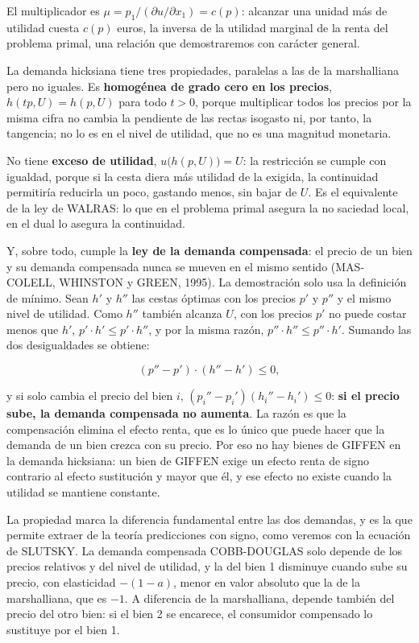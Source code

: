 \documentclass[10pt,a4paper]{article}
\begin{document}
El multiplicador es $\mu=p_1/(\partial u/\partial x_1)=c(p)$: alcanzar una unidad más de utilidad cuesta $c(p)$ euros, la inversa de la utilidad marginal de la renta del problema primal, una relación que demostraremos con carácter general.

La demanda hicksiana tiene tres propiedades, paralelas a las de la marshalliana pero no iguales. Es \textbf{homogénea de grado cero en los precios}, $h(tp,U)=h(p,U)$ para todo $t>0$, porque multiplicar todos los precios por la misma cifra no cambia la pendiente de las rectas isogasto ni, por tanto, la tangencia; no lo es en el nivel de utilidad, que no es una magnitud monetaria.

No tiene \textbf{exceso de utilidad}, $u\big(h(p,U)\big)=U$: la restricción se cumple con igualdad, porque si la cesta diera más utilidad de la exigida, la continuidad permitiría reducirla un poco, gastando menos, sin bajar de $U$. Es el equivalente de la ley de WALRAS: lo que en el problema primal asegura la no saciedad local, en el dual lo asegura la continuidad.

Y, sobre todo, cumple la \textbf{ley de la demanda compensada}: el precio de un bien y su demanda compensada nunca se mueven en el mismo sentido (MAS-COLELL, WHINSTON y GREEN, 1995). La demostración solo usa la definición de mínimo. Sean $h'$ y $h''$ las cestas óptimas con los precios $p'$ y $p''$ y el mismo nivel de utilidad. Como $h''$ también alcanza $U$, con los precios $p'$ no puede costar menos que $h'$, $p'\cdot h'\le p'\cdot h''$, y por la misma razón, $p''\cdot h''\le p''\cdot h'$. Sumando las dos desigualdades se obtiene:

$$(p''-p')\cdot(h''-h')\le0,$$

y si solo cambia el precio del bien $i$, $(p_i''-p_i')(h_i''-h_i')\le0$: \textbf{si el precio sube, la demanda compensada no aumenta}. La razón es que la compensación elimina el efecto renta, que es lo único que puede hacer que la demanda de un bien crezca con su precio. Por eso no hay bienes de GIFFEN en la demanda hicksiana: un bien de GIFFEN exige un efecto renta de signo contrario al efecto sustitución y mayor que él, y ese efecto no existe cuando la utilidad se mantiene constante.

La propiedad marca la diferencia fundamental entre las dos demandas, y es la que permite extraer de la teoría predicciones con signo, como veremos con la ecuación de SLUTSKY. La demanda compensada COBB-DOUGLAS solo depende de los precios relativos y del nivel de utilidad, y la del bien 1 disminuye cuando sube su precio, con elasticidad $-(1-a)$, menor en valor absoluto que la de la marshalliana, que es $-1$. A diferencia de la marshalliana, depende también del precio del otro bien: si el bien 2 se encarece, el consumidor compensado lo sustituye por el bien 1.
\end{document}
